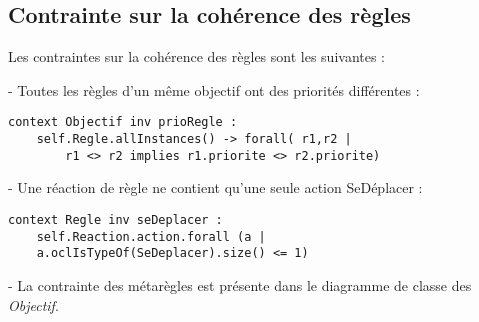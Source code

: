 
\subsection{Contrainte sur la cohérence des règles}
\label{sec:question20}

Les contraintes sur la cohérence des règles sont les suivantes :

- Toutes les règles d'un même objectif ont des priorités différentes :

\begin{lstlisting}[caption=Contrainte sur les priorités,captionpos=b,label={lst:règles},language=OCL]
context Objectif inv prioRegle :
    self.Regle.allInstances() -> forall( r1,r2 |
        r1 <> r2 implies r1.priorite <> r2.priorite)
\end{lstlisting}

- Une réaction de règle ne contient qu'une seule action SeDéplacer :

\begin{lstlisting}[caption=Contrainte sur SeDéplacer,captionpos=b,label={lst:SeDéplacer},language=OCL]
context Regle inv seDeplacer :
    self.Reaction.action.forall (a | 
    a.oclIsTypeOf(SeDeplacer).size() <= 1)
\end{lstlisting}

- La contrainte des métarègles est présente dans le diagramme de classe des \emph{Objectif}.